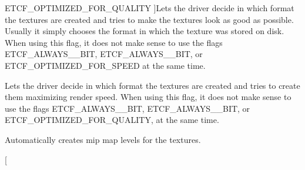 \begin{Desc}
\begin{description}
{E\+T\+C\+F\+\_\+\+O\+P\+T\+I\+M\+I\+Z\+E\+D\+\_\+\+F\+O\+R\+\_\+\+Q\+U\+A\+L\+I\+TY\hypertarget{namespaceirr_1_1video_acaf6f7414534f7d62bff18c5bf11876fadc5336eb55e0221ef0d7e53c1cf5a2b9}{}\label{namespaceirr_1_1video_acaf6f7414534f7d62bff18c5bf11876fadc5336eb55e0221ef0d7e53c1cf5a2b9}
}]Lets the driver decide in which format the textures are created and tries to make the textures look as good as possible. Usually it simply chooses the format in which the texture was stored on disk. When using this flag, it does not make sense to use the flags E\+T\+C\+F\+\_\+\+A\+L\+W\+A\+Y\+S\+\_\+\_\+\+B\+IT, E\+T\+C\+F\+\_\+\+A\+L\+W\+A\+Y\+S\+\_\+\_\+\+B\+IT, or E\+T\+C\+F\+\_\+\+O\+P\+T\+I\+M\+I\+Z\+E\+D\+\_\+\+F\+O\+R\+\_\+\+S\+P\+E\+ED at the same time. \item[{\em 
E\+T\+C\+F\+\_\+\+O\+P\+T\+I\+M\+I\+Z\+E\+D\+\_\+\+F\+O\+R\+\_\+\+S\+P\+E\+ED\hypertarget{namespaceirr_1_1video_acaf6f7414534f7d62bff18c5bf11876fa01693eaffcfeca7de6fcd7e826a909c3}{}\label{namespaceirr_1_1video_acaf6f7414534f7d62bff18c5bf11876fa01693eaffcfeca7de6fcd7e826a909c3}
}]Lets the driver decide in which format the textures are created and tries to create them maximizing render speed. When using this flag, it does not make sense to use the flags E\+T\+C\+F\+\_\+\+A\+L\+W\+A\+Y\+S\+\_\+\_\+\+B\+IT, E\+T\+C\+F\+\_\+\+A\+L\+W\+A\+Y\+S\+\_\+\_\+\+B\+IT, or E\+T\+C\+F\+\_\+\+O\+P\+T\+I\+M\+I\+Z\+E\+D\+\_\+\+F\+O\+R\+\_\+\+Q\+U\+A\+L\+I\+TY, at the same time. \item[{\em 
E\+T\+C\+F\+\_\+\+C\+R\+E\+A\+T\+E\+\_\+\+M\+I\+P\+\_\+\+M\+A\+PS\hypertarget{namespaceirr_1_1video_acaf6f7414534f7d62bff18c5bf11876fa288b302e9d4faaba80c7796c7bc1682c}{}\label{namespaceirr_1_1video_acaf6f7414534f7d62bff18c5bf11876fa288b302e9d4faaba80c7796c7bc1682c}
}]Automatically creates mip map levels for the textures. \item[{\em 
}
\end{description}
\end{Desc}
